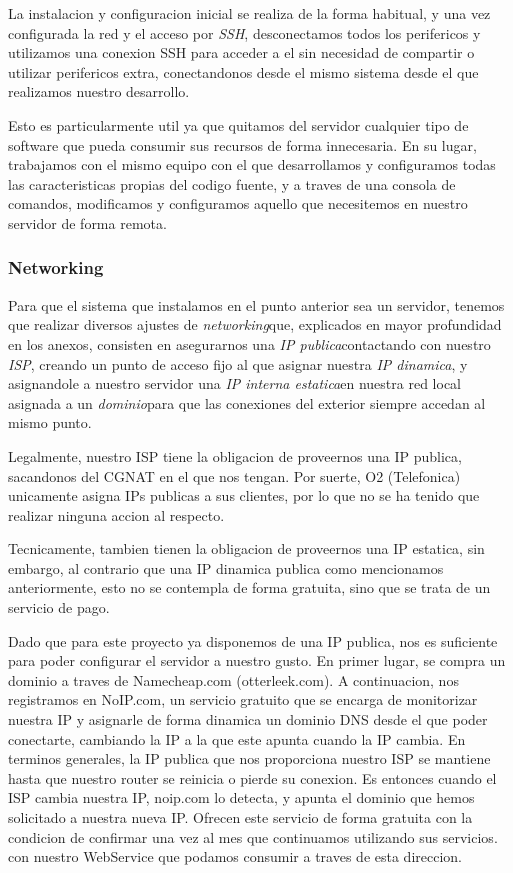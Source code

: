 \documentclass{article}
\begin{document}
La instalacion y configuracion inicial se realiza de la forma habitual, y una vez configurada la red y el acceso por \textit{SSH}\rep, desconectamos todos los perifericos y utilizamos una conexion SSH para acceder a el sin necesidad de compartir o utilizar perifericos extra, conectandonos desde el mismo sistema desde el que realizamos nuestro desarrollo.

Esto es particularmente util ya que quitamos del servidor cualquier tipo de software que pueda consumir sus recursos de forma innecesaria. En su lugar, trabajamos con el mismo equipo con el que desarrollamos y configuramos todas las caracteristicas propias del codigo fuente, y a traves de una consola de comandos, modificamos y configuramos aquello que necesitemos en nuestro servidor de forma remota.

\subsubsection{Networking}
Para que el sistema que instalamos en el punto anterior sea un servidor, tenemos que realizar diversos ajustes de \textit{networking}\rep que, explicados en mayor profundidad en los anexos, consisten en asegurarnos una \textit{IP publica}\rep contactando con nuestro \textit{ISP}\rep, creando un punto de acceso fijo al que asignar nuestra \textit{IP dinamica}\rep, y asignandole a nuestro servidor una \textit{IP interna estatica}\rep en nuestra red local asignada a un \textit{dominio}\rep para que las conexiones del exterior siempre accedan al mismo punto.

Legalmente, nuestro ISP tiene la obligacion de proveernos una IP publica, sacandonos del CGNAT en el que nos tengan. Por suerte, O2 (Telefonica) unicamente asigna IPs publicas a sus clientes, por lo que no se ha tenido que realizar ninguna accion al respecto.

Tecnicamente, tambien tienen la obligacion de proveernos una IP estatica, sin embargo, al contrario que una IP dinamica publica como mencionamos anteriormente, esto no se contempla de forma gratuita, sino que se trata de un servicio de pago.

Dado que para este proyecto ya disponemos de una IP publica, nos es suficiente para poder configurar el servidor a nuestro gusto. En primer lugar, se compra un dominio a traves de Namecheap.com (otterleek.com). A continuacion, nos registramos en NoIP.com, un servicio gratuito que se encarga de monitorizar nuestra IP y asignarle de forma dinamica un dominio DNS desde el que poder conectarte, cambiando la IP a la que este apunta cuando la IP cambia. En terminos generales, la IP publica que nos proporciona nuestro ISP se mantiene hasta que nuestro router se reinicia o pierde su conexion. Es entonces cuando el ISP cambia nuestra IP, noip.com lo detecta, y apunta el dominio que hemos solicitado a nuestra nueva IP. Ofrecen este servicio de forma gratuita con la condicion de confirmar una vez al mes que continuamos utilizando sus servicios.
con nuestro WebService que podamos consumir a traves de esta direccion.
\end{document}
